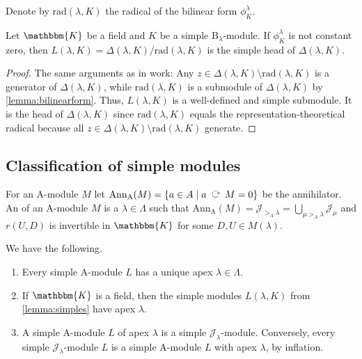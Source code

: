 \documentclass[a4paper,11pt]{amsart}
\let\emph\relax
\newcommand{\actsleft}{\mathop{\,\;\raisebox{1.7ex}{\rotatebox{-90}{$\circlearrowright$}}\;\,}}
\newcommand{\setstuff}[1]{\mathrm{#1}}
\newcommand{\KK}{\mathbbm{K}}
\numberwithin{equation}{section}
\let\fullref\autoref
\begin{document}
Denote by $\mathrm{rad}(\lambda,K)$ the radical of the 
bilinear form $\phi^{\lambda}_{K}$.

\begin{lemma}\label{lemma:simples}
Let $\KK$ be a field and $K$ be a simple 
$\setstuff{B}_{\lambda}$-module.
If $\phi^{\lambda}_{K}$ is not constant zero, then
$L(\lambda,K)=\Delta(\lambda,K)/\mathrm{rad}(\lambda,K)$ is 
the simple head of $\Delta(\lambda,K)$.
\end{lemma}

\begin{proof}
The same arguments as in \cite[Section 3A]{EhTu-relcell} work: 
Any $z\in\Delta(\lambda,K)\setminus\mathrm{rad}(\lambda,K)$ is a generator 
of $\Delta(\lambda,K)$, while $\mathrm{rad}(\lambda,K)$ is a submodule 
of $\Delta(\lambda,K)$ by \fullref{lemma:bilinearform}. 
Thus, $L(\lambda,K)$ is a well-defined and 
simple submodule. It is the head of $\Delta(\lambda,K)$ since $\mathrm{rad}(\lambda,K)$ equals 
the representation-theoretical radical because all 
$z\in\Delta(\lambda,K)\setminus\mathrm{rad}(\lambda,K)$ generate.
\end{proof}

\subsection{Classification of simple modules}\label{subsection:simples}

For an $\setstuff{A}$-module $M$ let 
$\mathrm{Ann}_{\setstuff{A}}(M)=
\{a\in A\mid a\actsleft M=0\}$ be the annihilator.
An \emph{apex} of an $\setstuff{A}$-module $M$ 
is a $\lambda\in\Lambda$ such that 
$\mathrm{Ann}_{\setstuff{A}}(M)=
\mathcal{J}_{{>_{\Lambda}}\lambda}=
\bigcup_{\mu>_{\Lambda}\lambda}\mathcal{J}_{\mu}$ 
and $r(U,D)$ is invertible in $\KK$ for some $D,U\in M(\lambda)$.

\begin{lemma}\label{lemma:apex}
We have the following.

\begin{enumerate}

\item Every simple $\setstuff{A}$-module $L$ has a unique apex 
$\lambda\in\Lambda$.

\item If $\KK$ is a field, then the simple modules $L(\lambda,K)$ 
from \fullref{lemma:simples}
have apex $\lambda$.

\item A simple $\setstuff{A}$-module $L$ of apex $\lambda$ is a 
simple $\mathcal{J}_{\lambda}$-module. Conversely, 
every simple $\mathcal{J}_{\lambda}$-module $L$ is a simple 
$\setstuff{A}$-module $L$ with apex $\lambda$, by inflation.

\end{enumerate}
\end{lemma}
\end{document}
